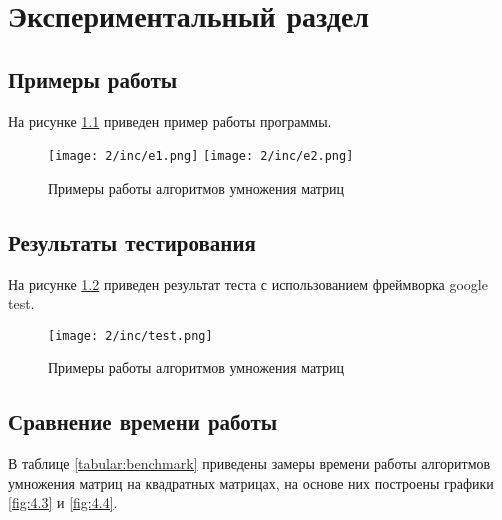 \chapter{Экспериментальный раздел}
\label{cha:research}

\section{Примеры работы}
На рисунке \ref{fig:4.1} приведен пример работы программы.

\begin{figure}[h]
    \centering
    \texttt{[image: 2/inc/e1.png]}
    \texttt{[image: 2/inc/e2.png]}
    \caption{Примеры работы алгоритмов умножения матриц}
    \label{fig:4.1}
\end{figure}


\pagebreak
\section{Результаты тестирования}

На рисунке \ref{fig:4.2} приведен результат теста с использованием фреймворка google test.

\begin{figure}[h]
    \centering
    \texttt{[image: 2/inc/test.png]}
    \caption{Примеры работы алгоритмов умножения матриц}
    \label{fig:4.2}
\end{figure}


\section{Сравнение времени работы}

В таблице \ref{tabular:benchmark} приведены замеры времени
работы алгоритмов умножения матриц на квадратных матрицах,
на основе них построены графики \ref{fig:4.3} и \ref{fig:4.4}.



\def\arraystretch{1.2}

